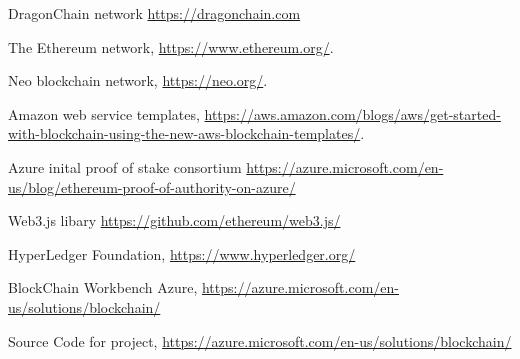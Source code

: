 \documentclass[runningheads]{llncs}
\begin{document}
%
%
%
% 
% 
%
\begin{thebibliography}{8}

DragonChain network \url{https://dragonchain.com}

The Ethereum network, \url{https://www.ethereum.org/}.

Neo blockchain network, \url{https://neo.org/}.

Amazon web service templates, \url{https://aws.amazon.com/blogs/aws/get-started-with-blockchain-using-the-new-aws-blockchain-templates/}.

Azure inital proof of stake consortium \url{https://azure.microsoft.com/en-us/blog/ethereum-proof-of-authority-on-azure/}

Web3.js libary \url{https://github.com/ethereum/web3.js/}

HyperLedger Foundation, \url{https://www.hyperledger.org/}


BlockChain Workbench Azure, \url{https://azure.microsoft.com/en-us/solutions/blockchain/}

Source Code for project, \url{https://azure.microsoft.com/en-us/solutions/blockchain/}
\end{thebibliography}
\end{document}
